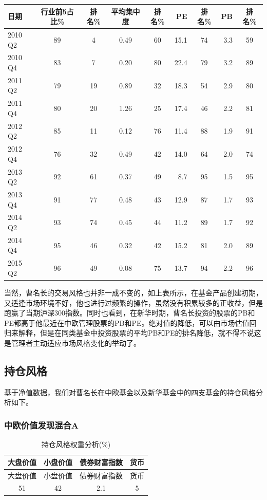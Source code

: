 \documentclass[hyperref,]{ctexart}
\begin{document}
\begin{longtable}[]{@{}lccccrcrc@{}}
\toprule
日期 & 行业前5占比\% & 排名\% & 平均集中度 & 排名\% & PE & 排名\% & PB &
排名\%\tabularnewline
\midrule
\endhead
2010 Q2 & 89 & 4 & 0.49 & 60 & 15.1 & 74 & 3.3 & 59\tabularnewline
2010 Q4 & 83 & 7 & 0.20 & 80 & 22.4 & 79 & 3.2 & 89\tabularnewline
2011 Q2 & 79 & 19 & 0.89 & 32 & 18.3 & 54 & 2.9 & 80\tabularnewline
2011 Q4 & 80 & 20 & 1.26 & 25 & 17.4 & 46 & 2.2 & 81\tabularnewline
2012 Q2 & 85 & 11 & 0.12 & 76 & 11.4 & 88 & 1.9 & 91\tabularnewline
2012 Q4 & 76 & 32 & 0.49 & 42 & 14.0 & 64 & 2.0 & 74\tabularnewline
2013 Q2 & 92 & 61 & 0.37 & 49 & 8.7 & 95 & 1.5 & 95\tabularnewline
2013 Q4 & 91 & 77 & 0.48 & 43 & 12.9 & 87 & 1.7 & 93\tabularnewline
2014 Q2 & 93 & 74 & 0.45 & 44 & 11.2 & 89 & 1.7 & 92\tabularnewline
2014 Q4 & 95 & 46 & 0.32 & 42 & 15.2 & 81 & 2.0 & 89\tabularnewline
2015 Q2 & 96 & 49 & 0.08 & 75 & 13.7 & 94 & 2.2 & 96\tabularnewline
\bottomrule
\end{longtable}

当然，曹名长的交易风格也并非一成不变的，如上表所示，在基金产品创建初期，又适逢市场环境不好，他也进行过频繁的操作，虽然没有积累较多的正收益，但是跑赢了当期沪深300指数。同时也看到，在新华时期，曹名长投资的股票的PB和PE都高于他最近在中欧管理股票的PB和PE。绝对值的降低，可以由市场估值回归来解释，但是在同类基金中投资股票的平均PB和PE的排名降低，就不得不说这是管理者主动适应市场风格变化的举动了。

\subsection{持仓风格}

基于净值数据，我们对曹名长在中欧基金以及新华基金中的四支基金的持仓风格分析如下。

\subsubsection{中欧价值发现混合A}\label{a}

\begin{longtable}[]{@{}cccc@{}}
\caption{持仓风格权重分析(\%)}\tabularnewline
\toprule
大盘价值 & 小盘价值 & 债券财富指数 & 货币\tabularnewline
\midrule
\endfirsthead
\toprule
大盘价值 & 小盘价值 & 债券财富指数 & 货币\tabularnewline
\midrule
\endhead
51 & 42 & 2.1 & 5\tabularnewline
\bottomrule
\end{longtable}
\end{document}

